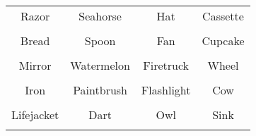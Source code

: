 \documentclass[12pt,a4paper]{article}
\begin{document}
\thispagestyle{empty}
\begin{table}[]
\centering
\Huge
\begin{tabular}{cccc}
 Razor& Seahorse& Hat& Cassette\\  & & & \\
 Bread& Spoon& Fan& Cupcake\\  & & & \\
 Mirror& Watermelon& Firetruck& Wheel\\  & & & \\
 Iron& Paintbrush& Flashlight& Cow\\  & & & \\
 Lifejacket& Dart& Owl& Sink\\  & & & \\
\end{tabular}
\end{table}
\end{document}
